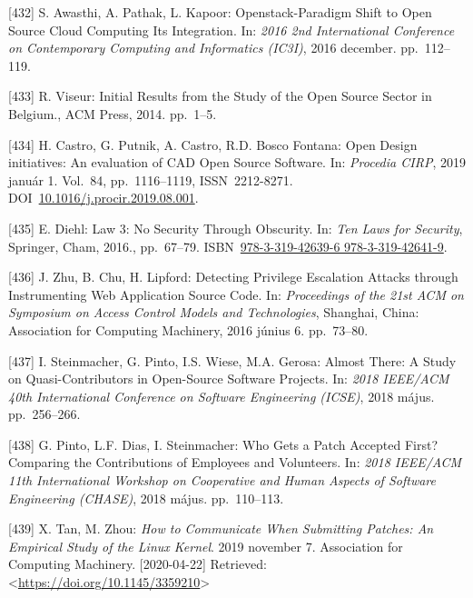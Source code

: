 \documentclass[12pt,magyar,a4paper,oneside]{scrreprt}
\newenvironment{cslreferences}%
  {}%
  {\par}
\begin{document}
\begin{cslreferences}
\leavevmode\hypertarget{ref-awasthi_openstack-paradigm_2016}{}%
{[}432{]} S. Awasthi, A. Pathak, L. Kapoor: Openstack-Paradigm Shift to
Open Source Cloud Computing Its Integration. In: \emph{2016 2nd
International Conference on Contemporary Computing and Informatics
(IC3I)}, 2016 december. pp.~112--119.

\leavevmode\hypertarget{ref-viseur_initial_2014}{}%
{[}433{]} R. Viseur: Initial Results from the Study of the Open Source
Sector in Belgium., ACM Press, 2014. pp.~1--5.

\leavevmode\hypertarget{ref-castro_open_2019}{}%
{[}434{]} H. Castro, G. Putnik, A. Castro, R.D. Bosco Fontana: Open
Design initiatives: An evaluation of CAD Open Source Software. In:
\emph{Procedia CIRP}, 2019 január 1. Vol.~84, pp.~1116--1119,
ISSN~2212-8271.
DOI~\href{https://doi.org/10.1016/j.procir.2019.08.001}{10.1016/j.procir.2019.08.001}.

\leavevmode\hypertarget{ref-diehl_law_2016}{}%
{[}435{]} E. Diehl: Law 3: No Security Through Obscurity. In: \emph{Ten
Laws for Security}, Springer, Cham, 2016., pp.~67--79.
ISBN~\href{https://worldcat.org/isbn/978-3-319-42639-6\%20978-3-319-42641-9}{978-3-319-42639-6 978-3-319-42641-9}.

\leavevmode\hypertarget{ref-zhu_detecting_2016}{}%
{[}436{]} J. Zhu, B. Chu, H. Lipford: Detecting Privilege Escalation
Attacks through Instrumenting Web Application Source Code. In:
\emph{Proceedings of the 21st ACM on Symposium on Access Control Models
and Technologies}, Shanghai, China: Association for Computing Machinery,
2016 június 6. pp.~73--80.

\leavevmode\hypertarget{ref-steinmacher_almost_2018}{}%
{[}437{]} I. Steinmacher, G. Pinto, I.S. Wiese, M.A. Gerosa: Almost
There: A Study on Quasi-Contributors in Open-Source Software Projects.
In: \emph{2018 IEEE/ACM 40th International Conference on Software
Engineering (ICSE)}, 2018 május. pp.~256--266.

\leavevmode\hypertarget{ref-pinto_who_2018}{}%
{[}438{]} G. Pinto, L.F. Dias, I. Steinmacher: Who Gets a Patch Accepted
First? Comparing the Contributions of Employees and Volunteers. In:
\emph{2018 IEEE/ACM 11th International Workshop on Cooperative and Human
Aspects of Software Engineering (CHASE)}, 2018 május. pp.~110--113.

\leavevmode\hypertarget{ref-tan_how_2019}{}%
{[}439{]} X. Tan, M. Zhou: \emph{How to Communicate When Submitting
Patches: An Empirical Study of the Linux Kernel}. 2019 november 7.
Association for Computing Machinery. {[}2020-04-22{]} Retrieved:
\textless{}\url{https://doi.org/10.1145/3359210}\textgreater{}


\end{cslreferences}
\end{document}
